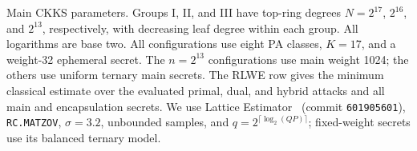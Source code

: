 \begin{table}[h] \centering \caption{Main CKKS parameters. Groups I, II, and III have top-ring degrees \(N=2^{17}\), \(2^{16}\), and \(2^{13}\), respectively, with decreasing leaf degree within each group. All logarithms are base two. All configurations use eight PA classes, \(K=17\), and a weight-32 ephemeral secret. The \(n=2^{13}\) configurations use main weight 1024; the others use uniform ternary main secrets. The RLWE row gives the minimum classical estimate over the evaluated primal, dual, and hybrid attacks and all main and encapsulation secrets. We use Lattice Estimator~\cite{JMC:AlbPlaSco15} (commit \texttt{601905601}), \texttt{RC.MATZOV}, \(\sigma=3.2\), unbounded samples, and \(q=2^{\lceil\log_2(QP)\rceil}\); fixed-weight secrets use its balanced ternary model.} \vspace{4pt}

    \label{tab:pa-rs-parameters}
  

\end{table}
